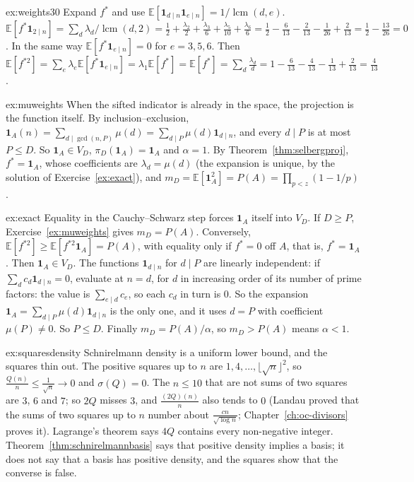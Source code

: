 \begin{solution}{ex:weights30}
\idea Expand $f^*$ and use $\mathbb E[\mathbf 1_{d\mid n}\mathbf 1_{e\mid n}]=1/\operatorname{lcm}(d,e)$.
\writeup $\mathbb E[f^*\mathbf 1_{2\mid n}]=\sum_d\lambda_d/\operatorname{lcm}(d,2)=\frac12+\frac{\lambda_2}2+\frac{\lambda_3}6+\frac{\lambda_5}{10}+\frac{\lambda_6}6=\frac12-\frac6{13}-\frac2{13}-\frac1{26}+\frac2{13}=\frac12-\frac{13}{26}=0$. In the same way $\mathbb E[f^*\mathbf 1_{e\mid n}]=0$ for $e=3,5,6$. Then $\mathbb E[f^{*2}]=\sum_e\lambda_e\mathbb E[f^*\mathbf 1_{e\mid n}]=\lambda_1\mathbb E[f^*]=\mathbb E[f^*]=\sum_d\frac{\lambda_d}d=1-\frac6{13}-\frac4{13}-\frac1{13}+\frac2{13}=\frac4{13}$.
\end{solution}

\begin{solution}{ex:muweights}
\idea When the sifted indicator is already in the space, the projection is the function itself.
\writeup By inclusion--exclusion, $\mathbf 1_A(n)=\sum_{d\mid\gcd(n,P)}\mu(d)=\sum_{d\mid P}\mu(d)\mathbf 1_{d\mid n}$, and every $d\mid P$ is at most $P\le D$. So $\mathbf 1_A\in V_D$, $\pi_D(\mathbf 1_A)=\mathbf 1_A$ and $\alpha=1$. By Theorem~\ref{thm:selbergproj}, $f^*=\mathbf 1_A$, whose coefficients are $\lambda_d=\mu(d)$ (the expansion is unique, by the solution of Exercise~\ref{ex:exact}), and $m_D=\mathbb E[\mathbf 1_A^2]=P(A)=\prod_{p<z}(1-1/p)$.
\end{solution}

\begin{solution}{ex:exact}
\idea Equality in the Cauchy--Schwarz step forces $\mathbf 1_A$ itself into $V_D$.
\writeup If $D\ge P$, Exercise~\ref{ex:muweights} gives $m_D=P(A)$. Conversely, $\mathbb E[f^{*2}]\ge\mathbb E[f^{*2}\mathbf 1_A]=P(A)$, with equality only if $f^*=0$ off $A$, that is, $f^*=\mathbf 1_A$. Then $\mathbf 1_A\in V_D$. The functions $\mathbf 1_{d\mid n}$ for $d\mid P$ are linearly independent: if $\sum_dc_d\mathbf 1_{d\mid n}=0$, evaluate at $n=d$, for $d$ in increasing order of its number of prime factors: the value is $\sum_{e\mid d}c_e$, so each $c_d$ in turn is $0$. So the expansion $\mathbf 1_A=\sum_{d\mid P}\mu(d)\mathbf 1_{d\mid n}$ is the only one, and it uses $d=P$ with coefficient $\mu(P)\ne0$. So $P\le D$. Finally $m_D=P(A)/\alpha$, so $m_D>P(A)$ means $\alpha<1$.
\end{solution}

\begin{solution}{ex:squaresdensity}
\idea Schnirelmann density is a uniform lower bound, and the squares thin out.
\writeup The positive squares up to $n$ are $1,4,\dots,\lfloor\sqrt n\rfloor^2$, so $\frac{Q(n)}n\le\frac1{\sqrt n}\to0$ and $\sigma(Q)=0$. The $n\le10$ that are not sums of two squares are $3$, $6$ and $7$; so $2Q$ misses $3$, and $\frac{(2Q)(n)}n$ also tends to $0$ (Landau proved that the sums of two squares up to $n$ number about $\frac{cn}{\sqrt{\log n}}$; Chapter~\ref{ch:oc-divisors} proves it). Lagrange's theorem says $4Q$ contains every non-negative integer. Theorem~\ref{thm:schnirelmannbasis} says that positive density implies a basis; it does not say that a basis has positive density, and the squares show that the converse is false.
\end{solution}

